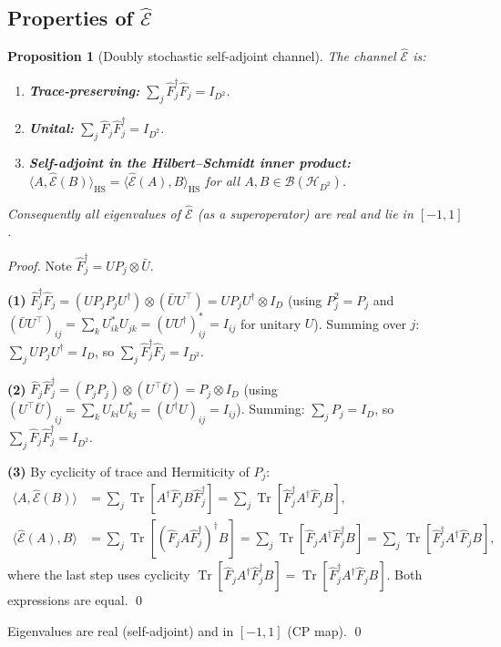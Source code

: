 \documentclass[12pt,a4paper]{article}
\newtheorem{proposition}[theorem]{Proposition}
\begin{document}
\subsection{Properties of $\hat{\mathcal{E}}$}
\label{sec:Ehat_props}

\begin{proposition}[Doubly stochastic self-adjoint channel]
\label{prop:Ehat_props}
The channel $\hat{\mathcal{E}}$ is:
\begin{enumerate}
\item \textbf{Trace-preserving:} $\sum_j\hat{F}_j^\dagger\hat{F}_j=I_{D^2}$.
\item \textbf{Unital:} $\sum_j\hat{F}_j\hat{F}_j^\dagger=I_{D^2}$.
\item \textbf{Self-adjoint in the Hilbert--Schmidt inner product:}
  $\langle A,\hat{\mathcal{E}}(B)\rangle_{\mathrm{HS}}=\langle\hat{\mathcal{E}}(A),B\rangle_{\mathrm{HS}}$
  for all $A,B\in\mathcal{B}(\mathcal{H}_{D^2})$.
\end{enumerate}
Consequently all eigenvalues of $\hat{\mathcal{E}}$ (as a superoperator) are real
and lie in $[-1,1]$.
\end{proposition}

\begin{proof}
Note $\hat{F}_j^\dagger = UP_j\otimes\bar{U}$.

\textbf{(1)} $\hat{F}_j^\dagger\hat{F}_j=(UP_jP_j U^\dagger)\otimes(\bar{U}U^\top)=
UP_j U^\dagger\otimes I_D$ (using $P_j^2=P_j$ and $(\bar{U}U^\top)_{ij}=\sum_k U^*_{ik}U_{jk}=(UU^\dagger)^*_{ij}=I_{ij}$ for unitary $U$). Summing over $j$: $\sum_j UP_j U^\dagger=I_D$, so $\sum_j\hat{F}_j^\dagger\hat{F}_j=I_{D^2}$.

\textbf{(2)} $\hat{F}_j\hat{F}_j^\dagger=(P_jP_j)\otimes(U^\top\bar{U})=P_j\otimes I_D$ (using $(U^\top\bar{U})_{ij}=\sum_k U_{ki}U^*_{kj}=(U^\dagger U)_{ij}=I_{ij}$). Summing: $\sum_j P_j=I_D$, so $\sum_j\hat{F}_j\hat{F}_j^\dagger=I_{D^2}$.

\textbf{(3)} By cyclicity of trace and Hermiticity of $P_j$:
\begin{align*}
\langle A,\hat{\mathcal{E}}(B)\rangle
&=\sum_j\operatorname{Tr}[A^\dagger\hat{F}_j B\hat{F}_j^\dagger]
=\sum_j\operatorname{Tr}[\hat{F}_j^\dagger A^\dagger\hat{F}_j B],\\
\langle\hat{\mathcal{E}}(A),B\rangle
&=\sum_j\operatorname{Tr}[(\hat{F}_j A\hat{F}_j^\dagger)^\dagger B]
=\sum_j\operatorname{Tr}[\hat{F}_j A^\dagger\hat{F}_j^\dagger B]
=\sum_j\operatorname{Tr}[\hat{F}_j^\dagger A^\dagger\hat{F}_j B],
\end{align*}
where the last step uses cyclicity $\operatorname{Tr}[\hat{F}_j A^\dagger\hat{F}_j^\dagger B]=\operatorname{Tr}[\hat{F}_j^\dagger A^\dagger\hat{F}_j B]$. Both expressions are equal. \qed

Eigenvalues are real (self-adjoint) and in $[-1,1]$ (CP map). \qed
\end{proof}
\end{document}
